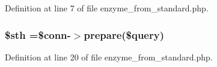 Definition at line 7 of file enzyme\-\_\-from\-\_\-standard.\-php.

\hypertarget{standard_2enzyme__from__standard_8php_afa9126f9664959c02795be300a135f93}{
\subsubsection[{\$sth}]{\setlength{\rightskip}{0pt plus 5cm}\$sth =\$conn-\/$>$prepare(\$query)}}\label{standard_2enzyme__from__standard_8php_afa9126f9664959c02795be300a135f93}


Definition at line 20 of file enzyme\-\_\-from\-\_\-standard.\-php.


